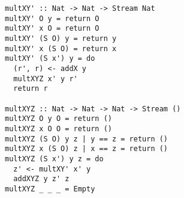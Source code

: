 \begin{figure}[!t]
  \centering
  \begin{minipage}{\columnwidth}
    \begin{lstlisting}[label={mult_slow}, caption={Inefficient implementation of \lstinline{multo in in out} direciton}, captionpos=b, frame=tb]
multXY' :: Nat -> Nat -> Stream Nat
multXY' O y = return O
multXY' x O = return O
multXY' (S O) y = return y
multXY' x (S O) = return x
multXY' (S x') y = do
  (r', r) <- addX y
  multXYZ x' y r'
  return r

multXYZ :: Nat -> Nat -> Nat -> Stream ()
multXYZ O y O = return ()
multXYZ x O O = return ()
multXYZ (S O) y z | y == z = return ()
multXYZ x (S O) z | x == z = return ()
multXYZ (S x') y z = do
  z' <- multXY' x' y
  addXYZ y z' z
multXYZ _ _ _ = Empty
    \end{lstlisting}
  \end{minipage}
\end{figure}